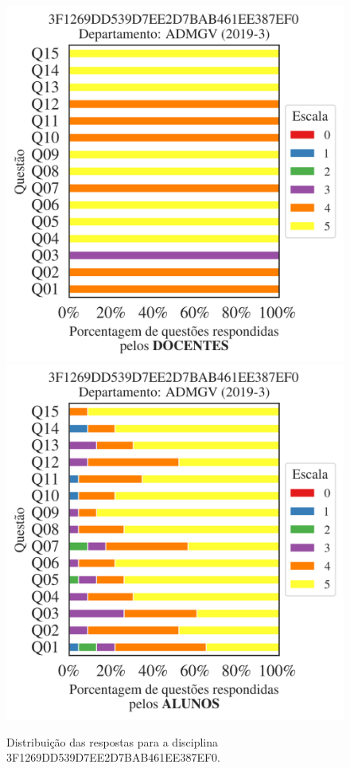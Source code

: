 \documentclass[a4paper,10pt]{article}
\begin{document}
\begin{figure}[h]
\centering
\includegraphics[width=0.485\linewidth]{analise_disciplina_departamento_ADMGV_3F1269DD539D7EE2D7BAB461EE387EF0_docentes.png}
\includegraphics[width=0.485\linewidth]{analise_disciplina_departamento_ADMGV_3F1269DD539D7EE2D7BAB461EE387EF0_alunos.png}
\caption{\label{fig:analise_geral_departamento}                Distribuição das respostas para a disciplina 3F1269DD539D7EE2D7BAB461EE387EF0. }
\end{figure}
\end{document}
